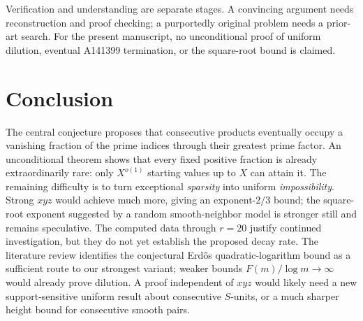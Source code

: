 \documentclass[11pt,letterpaper]{article}
\theoremstyle{remark}
\begin{document}
Verification and understanding are separate stages. A convincing
argument needs reconstruction and proof checking; a purportedly
original problem needs a prior-art search. For the present manuscript,
no unconditional proof of uniform dilution, eventual A141399
termination, or the square-root bound is claimed.

\section{Conclusion}
The central conjecture proposes that consecutive products eventually
occupy a vanishing fraction of the prime indices through their
greatest prime factor. An unconditional theorem shows that every
fixed positive fraction is already extraordinarily rare:
only $X^{o(1)}$ starting values up to $X$ can attain it. The
remaining difficulty is to turn exceptional \emph{sparsity} into
uniform \emph{impossibility}. Strong $xyz$ would achieve much more,
giving an exponent-$2/3$ bound; the square-root exponent suggested
by a random smooth-neighbor model is stronger still and remains
speculative. The computed data through $r=20$ justify continued
investigation, but they do not yet establish the proposed decay
rate. The literature review identifies the conjectural Erd\H{o}s quadratic-logarithm bound as a sufficient route to our strongest variant; weaker bounds $F(m)/\log m\to\infty$ would already prove dilution. A proof independent of $xyz$ would likely need a new
support-sensitive uniform result about consecutive $S$-units,
or a much sharper height bound for consecutive smooth pairs.
\end{document}
